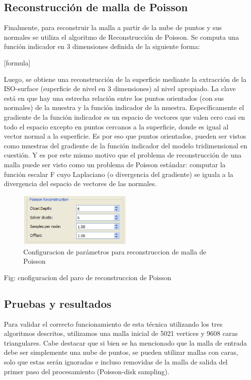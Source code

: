 \subsection{Reconstrucción de malla de Poisson}

Finalmente, para reconstruir la malla a partir de la nube de puntos y sus normales se utiliza el algoritmo de Reconstrucción de Poisson.
Se computa una función indicador  en 3 dimensiones definida de la siguiente forma:

[formula]

Luego, se obtiene una reconstrucción de la superficie mediante la extracción de la ISO-surface (superficie de nivel en 3 dimensiones) al nivel apropiado.
La clave está en que hay una estrecha relación entre los puntos orientados (con sus normales) de la muestra y la función indicador de la muestra. Específicamente el gradiente de la función indicador es un espacio de vectores que valen cero casi en todo el espacio excepto en puntos cercanos a la superficie, donde es igual al vector normal a la superficie.
Es por eso que puntos orientados, pueden ser vistos como muestras del gradiente de la función indicador del modelo tridimensional en cuestión. Y es por este mismo motivo que el problema de reconstrucción de una malla puede ser visto como un problema de Poisson estándar: computar la función escalar F cuyo Laplaciano (o divergencia del gradiente) se iguala a la divergencia del espacio de vectores de las normales.

\begin{figure}[H]
  \centering
    \includegraphics[width=0.5\textwidth]{./Cap6_reconstruccion/malla-poissonreconstruction.png}
  \caption{Configuracion de parámetros para reconstruccion de malla de Poisson}
  \label{fig:Mesh-Normals}
\end{figure}

Fig: cnofiguracion del paro de reconstruccion de Poisson

\subsection{Pruebas y resultados}

Para validar el correcto funcionamiento de esta técnica utilizando los tres algoritmos descritos, utilizamos una malla inicial de 5021 vertices y 9608 caras triangulares. Cabe destacar que si bien se ha mencionado que la malla de entrada debe ser simplemente una nube de puntos, se pueden utilizar mallas con caras, solo que estas serán ignoradas e incluso removidas de la malla de salida del primer paso del procesamiento (Poisson-disk sampling).
